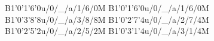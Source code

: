 B1'0'1'6'0u/0/_/a/1/6/0M
B1'0'1'6'0u/0/_/a/1/6/0M
B1'0'3'8'8u/0/_/a/3/8/8M
B1'0'2'7'4u/0/_/a/2/7/4M
B1'0'2'5'2u/0/_/a/2/5/2M
B1'0'3'1'4u/0/_/a/3/1/4M
